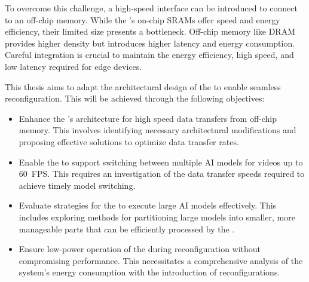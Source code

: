 To overcome this challenge, a high-speed interface can be introduced to connect to an off-chip memory.
While the \graicore{}'s on-chip SRAMs offer speed and energy efficiency, their limited size presents a bottleneck.
Off-chip memory like DRAM provides higher density but introduces higher latency and energy consumption.
Careful integration is crucial to maintain the energy efficiency, high speed, and low latency required for edge devices.

This thesis aims to adapt the architectural design of the \graicore{} to enable seamless reconfiguration.
This will be achieved through the following objectives:
\begin{itemize}
    \item
    Enhance the \graicore{}'s architecture for high speed data transfers from off-chip memory.
    This involves identifying necessary architectural modifications and proposing effective solutions to optimize data transfer rates.
    \item
    Enable the \graicore{} to support switching between multiple AI models for videos up to \SI{60}{FPS}.
    This requires an investigation of the data transfer speeds required to achieve timely model switching.
    \item
    Evaluate strategies for the \graicore{} to execute large AI models effectively.
    This includes exploring methods for partitioning large models into smaller, more manageable parts that can be efficiently processed by the \graicore{}.
    \item
    Ensure low-power operation of the \graicore{} during reconfiguration without compromising performance.
    This necessitates a comprehensive analysis of the system's energy consumption with the introduction of reconfigurations.
\end{itemize}